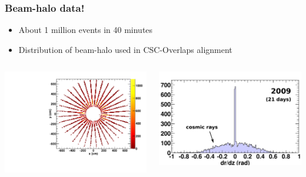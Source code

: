 \documentclass[compress]{beamer}
\begin{document}
\begin{frame}
\frametitle{Beam-halo data!}

\begin{itemize}
\item About 1 million events in 40 minutes
\item Distribution of beam-halo used in CSC-Overlaps alignment
\end{itemize}

\begin{columns}
\includegraphics[width=\linewidth]{allstations.pdf}

\includegraphics[width=\linewidth]{beamhalo2009_drdz.pdf}


\end{columns}
\end{frame}
\end{document}
